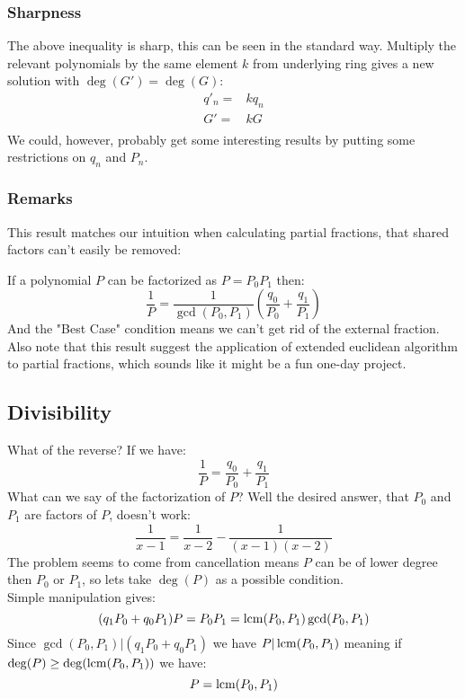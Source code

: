 \subsubsection{Sharpness}
The above inequality is sharp,
this can be seen in the standard way.
Multiply the relevant polynomials by the same element $k$ from underlying ring gives a new solution with $\deg(G') = \deg(G)$:
\begin{equation*}
\begin{aligned}
	q'_n =& kq_n\\
	G' =& kG\\
\end{aligned}
\end{equation*}
We could, however, probably get some interesting results by putting some restrictions on $q_n$ and $P_n$.

\subsubsection{Remarks}
This result matches our intuition when calculating partial fractions,
that shared factors can't easily be removed:

If a polynomial $P$ can be factorized as $P=P_0P_1$ then:
\[\frac{1}{P} = \frac{1}{\gcd(P_0,P_1)}\left(\frac{q_0}{P_0}+\frac{q_1}{P_1}\right)\]
And the "Best Case" condition means we can't get rid of the external fraction.
\\

Also note that this result suggest the application of extended euclidean algorithm to partial fractions,
which sounds like it might be a fun one-day project.

\subsection{Divisibility}
What of the reverse?
If we have:
\[\frac{1}{P} = \frac{q_0}{P_0}+\frac{q_1}{P_1}\]
What can we say of the factorization of $P$?
Well the desired answer,
that $P_0$ and $P_1$ are factors of $P$,
doesn't work:
\[\frac{1}{x-1} = \frac{1}{x-2}-\frac{1}{(x-1)(x-2)}\]
The problem seems to come from cancellation means $P$ can be of lower degree then $P_0$ or $P_1$,
so lets take $\deg(P)$ as a possible condition.
\\

Simple manipulation gives:
\[(q_1P_0+q_0P_1)P = P_0P_1 = \operatorname{lcm}(P_0,P_1)\gcd(P_0,P_1)\]
Since $\gcd(P_0,P_1) | (q_1P_0+q_0P_1)$ we have $P | \operatorname{lcm}(P_0,P_1)$ meaning if $\deg(P) \geq \deg(\operatorname{lcm}(P_0,P_1))$ we have:
\[P = \operatorname{lcm}(P_0,P_1)\]

